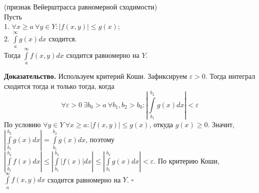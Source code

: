 \begin{theor}
    (признак Вейерштрасса равномерной сходимости)\\
    Пусть\\
    1. $\forall x\geqslant a~\forall y\in Y:|f(x,y)|\leqslant g(x)$;\\
    2. $\int\limits_{a}^{\infty}g(x)dx$ сходится.\\
Тогда $\int\limits_{a}^{\infty}f(x,y)dx$ сходится равномерно на  $Y$.
\end{theor}
\textbf{Доказательство.}  Используем критерий Коши. Зафиксируем 
$\varepsilon>0$. Тогда интеграл сходится тогда и только тогда, когда
$$\forall \varepsilon>0~\exists b_0>a~\forall b_1,b_2>b_0:
\left| \int\limits_{b_1}^{b_2} g(x)dx \right|<\varepsilon$$
По условию $\forall y\in Y~\forall x\geqslant a:|f(x,y)|\leqslant g(x)$, 
откуда $g(x)\geqslant 0$. Значит,
$\left|\int\limits_{b_1}^{b_2}g(x)dx\right|=\int\limits_{b_1}^{b_2}g(x)dx$,
поэтому $\left| \int\limits_{b_1}^{b_2}f(x)dx \right| \leqslant 
\left| \int\limits_{b_1}^{b_2} |f(x)|dx \right| \leqslant 
\left| \int\limits_{b_1}^{b_2}g(x)dx\right| <\varepsilon$. По критерию Коши,
$\int\limits_{a}^{\infty}f(x,y)dx$ сходится равномерно на $Y$. $\square$ 


